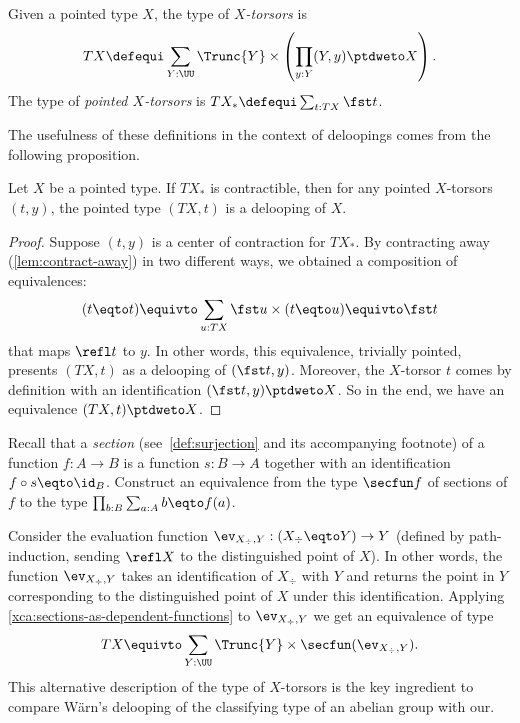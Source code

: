\begin{definition}[W\"{a}rn]
  Given a pointed type $X$, the type of {\em $X$-torsors} is
  \begin{displaymath}
    TX \defequi \sum_{Y : \UU} \Trunc{Y} \times \left( \prod_{y:Y}(Y,y) \ptdweto X \right).
  \end{displaymath}
  The type of {\em pointed $X$-torsors} is
  $TX_\ast \defequi \sum_{t : TX}\fst t$.
\end{definition}
The usefulness of these definitions in the context of deloopings comes
from the following proposition.
\begin{lemma}[W\"{a}rn]
  Let $X$ be a pointed type. If $TX_\ast$ is contractible, then for
  any pointed $X$-torsors $(t,y)$, the pointed type $(TX,t)$ is a
  delooping of $X$.
\end{lemma}
\begin{proof}
  Suppose $(t,y)$ is a center of contraction for $TX_\ast$. By
  contracting away (\cref{lem:contract-away}) in two different ways,
  we obtained a composition of equivalences:
  \begin{displaymath}
    (t \eqto t) \equivto \sum_{u : TX}\fst u \times (t \eqto u) \equivto \fst t 
  \end{displaymath}
  that maps $\refl t$ to $y$. In other words, this equivalence,
  trivially pointed, presents $(TX, t)$ as a delooping of
  $(\fst t, y)$. Moreover, the $X$-torsor $t$ comes by definition with
  an identification $(\fst t,y) \ptdweto X$. So in the end, we have an
  equivalence $(TX, t) \ptdweto X$.
\end{proof}

\begin{exercise}\label{xca:sections-as-dependent-functions}
  Recall that a {\em section} (see~\cref{def:surjection} and its
  accompanying footnote) of a function $f:A \to B$ is a function
  $s: B \to A$ together with an identification $f\circ s \eqto \id_B$.
  Construct an equivalence from the type $\secfun f$ of sections of
  $f$ to the type $\prod_{b:B}\sum_{a:A}b \eqto f(a)$.
\end{exercise}

Consider the evaluation function
$\ev_{X_\div,Y} : (X_\div \eqto Y) \to Y$ (defined by path-induction,
sending $\refl X$ to the distinguished point of $X$). In other words,
the function $\ev_{X_\div,Y}$ takes an identification of $X_\div$ with
$Y$ and returns the point in $Y$ corresponding to the distinguished
point of $X$ under this identification.  Applying
\cref{xca:sections-as-dependent-functions} to $\ev_{X_\div,Y}$ we get
an equivalence of type
\begin{displaymath}
  TX \equivto \sum_{Y : \UU} \Trunc{Y} \times \secfun(\ev_{X_\div,Y}).
\end{displaymath}
This alternative description of the type of $X$-torsors is the key
ingredient to compare W\"arn's delooping of the classifying type of
an abelian group with our.

